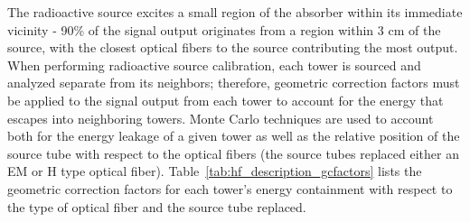 \begin{table}[!h] \centering {}
  \caption{Geometric correction factors for each tower's energy containment for a radioactive source
  passing through a given source tube. The value depends on what source tube contains the radioactive
  source and whether there is a match between the type of optical fiber that the source tube replaced.}
  \label{tab:hf_description_gcfactors}
\end{table}

The radioactive source excites a small region of the absorber within its immediate vicinity - 90\% of the signal output originates from a region within 3 cm of the source, with the closest optical fibers to the source contributing the most output. When performing radioactive source calibration, each tower is sourced
and analyzed separate from its neighbors; therefore, geometric correction factors must be applied to the signal output from each tower to account for the energy that escapes into neighboring towers. Monte Carlo techniques are used to account both for the energy leakage of a given tower as well as the relative position of the source tube with respect to the optical fibers (the source tubes replaced
either an EM or H type optical fiber). Table~\ref{tab:hf_description_gcfactors} lists the geometric correction factors for each tower's energy containment with respect to the type of optical fiber and the source tube replaced.

